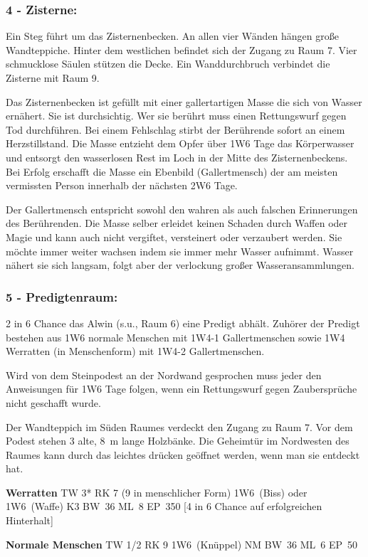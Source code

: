 \subsubsection{4 - Zisterne:} Ein Steg führt um das Zisternenbecken. An allen vier
Wänden hängen große Wandteppiche. Hinter dem westlichen befindet sich
der Zugang zu Raum 7. Vier schmucklose Säulen stützen die Decke. Ein
Wanddurchbruch verbindet die Zisterne mit Raum 9.  

Das Zisternenbecken ist
gefüllt mit einer gallertartigen Masse die sich von Wasser ernähert. Sie
ist durchsichtig. Wer sie berührt muss einen Rettungswurf gegen Tod
durchführen. Bei einem Fehlschlag stirbt der Berührende sofort an
einem Herzstillstand. Die Masse entzieht dem Opfer über 1W6 Tage das
Körperwasser und entsorgt den wasserlosen Rest im Loch in der Mitte
des Zisternenbeckens. Bei Erfolg erschafft die Masse ein Ebenbild
(Gallertmensch) der am meisten vermissten Person innerhalb der nächsten
2W6 Tage. 

Der Gallertmensch entspricht sowohl den wahren als auch falschen
Erinnerungen des Berührenden.  Die Masse selber erleidet keinen Schaden
durch Waffen oder Magie und kann auch nicht vergiftet, versteinert oder
verzaubert werden. Sie möchte immer weiter wachsen indem sie immer
mehr Wasser aufnimmt. Wasser nähert sie sich langsam, folgt aber der
verlockung großer Wasseransammlungen.

\subsubsection{5 - Predigtenraum:} 2 in 6 Chance das Alwin (s.u., Raum 6)
eine Predigt abhält. Zuhörer
der Predigt bestehen aus 1W6 normale Menschen mit 1W4-1 Gallertmenschen
sowie 1W4 Werratten (in Menschenform) mit 1W4-2 Gallertmenschen. 

Wird von
dem Steinpodest an der Nordwand gesprochen muss jeder den Anweisungen
für 1W6 Tage folgen, wenn ein Rettungswurf gegen Zaubersprüche nicht
geschafft wurde. 

Der Wandteppich im Süden Raumes verdeckt den Zugang
zu Raum 7. Vor dem Podest stehen 3 alte, 8~m lange Holzbänke. Die
Geheimtür im Nordwesten des Raumes kann durch das leichtes drücken
geöffnet werden, wenn man sie entdeckt hat.  

\textbf{Werratten} TW 3* RK 7 (9
in menschlicher Form) 1W6~(Biss) oder 1W6~(Waffe) K3 BW~36 ML~8 EP~350
[4 in 6 Chance auf erfolgreichen Hinterhalt] 

\textbf{Normale Menschen} TW 1/2 RK 9 1W6~(Knüppel) NM BW~36 ML~6 EP~50

